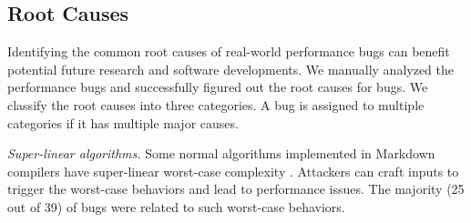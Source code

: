 \subsection{Root Causes}
\label{s:study-root-causes}
%
Identifying the common root causes of real-world performance bugs can benefit potential future research and software developments.
%
We manually analyzed the performance bugs and successfully figured out the root causes for \XX bugs.
%
We classify the root causes into three categories.
%
A bug is assigned to multiple categories if it has multiple major causes.


 \emph{Super-linear algorithms.}
Some normal algorithms implemented in Markdown compilers have super-linear worst-case complexity \cite{slowfuzz, perffuzz}.
%
Attackers can craft inputs to trigger the worst-case behaviors and lead to performance issues.
%
%
The majority (25 out of 39) of bugs were related to such worst-case behaviors.
%
%
%
%
%
%
%
%
%
%
%
%
%
%

